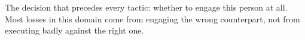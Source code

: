 
\begin{chapterblurb}
The decision that precedes every tactic: whether to engage this person at all. Most losses in this domain come from engaging the wrong counterpart, not from executing badly against the right one.
\end{chapterblurb}

